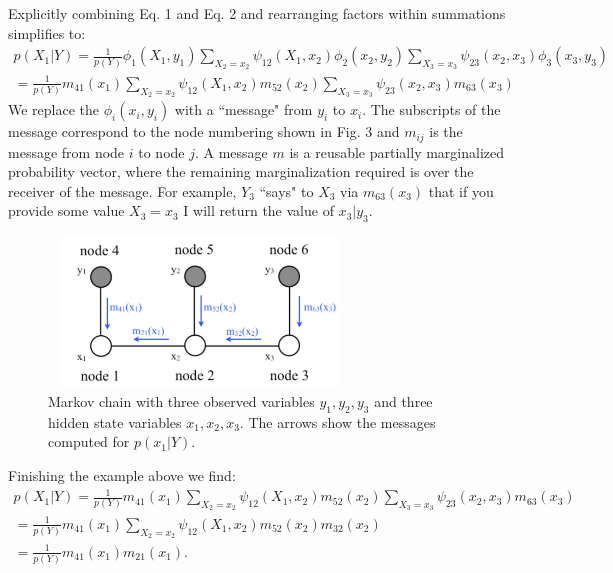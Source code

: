 \documentclass[11pt]{article}
\begin{document}
Explicitly combining Eq. 1 and Eq. 2 and rearranging factors within summations simplifies to:
\begin{gather*}
p(X_1 | Y) = \frac{1}{p(Y)} \phi_1(X_1, y_1) \sum_{X_2 = x_2} \psi_{12}(X_1, x_2) \phi_2(x_2, y_2) \sum_{X_3 = x_3} \psi_{23}(x_2, x_3) \phi_3(x_3, y_3)\\
= \frac{1}{p(Y)} m_{41}(x_1) \sum_{X_2 = x_2} \psi_{12}(X_1, x_2) m_{52}(x_2) \sum_{X_3 = x_3} \psi_{23}(x_2, x_3) m_{63}(x_3)
\end{gather*}
We replace the $\phi_i(x_i, y_i)$ with a ``message" from $y_i$ to $x_i$.  The subscripts of the message correspond to the node numbering shown in Fig. 3 and $m_{ij}$ is the message from node $i$ to node $j$.  A message $m$ is a reusable partially marginalized probability vector, where the remaining marginalization required is over the receiver of the message.  For example, $Y_3$ ``says" to $X_3$ via $m_{63}(x_3)$ that if you provide some value $X_3 = x_3$ I will return the value of $x_3 | y_3$.

\begin{figure}
	\begin{center}
		\includegraphics[width=8cm, height=4cm]{bp}
	\end{center}
	\caption{Markov chain with three observed variables $y_1, y_2, y_3$ and three hidden state variables $x_1, x_2, x_3$.  The arrows show the messages computed for $p(x_1 | Y)$.}
\end{figure}

Finishing the example above we find:
\begin{gather*}
p(X_1 | Y) = \frac{1}{p(Y)} m_{41}(x_1) \sum_{X_2 = x_2} \psi_{12}(X_1, x_2) m_{52}(x_2) \sum_{X_3 = x_3} \psi_{23}(x_2, x_3) m_{63}(x_3)\\
= \frac{1}{p(Y)} m_{41}(x_1) \sum_{X_2 = x_2} \psi_{12}(X_1, x_2) m_{52}(x_2) m_{32}(x_2)\\
= \frac{1}{p(Y)} m_{41}(x_1) m_{21}(x_1).
\end{gather*}
\end{document}

